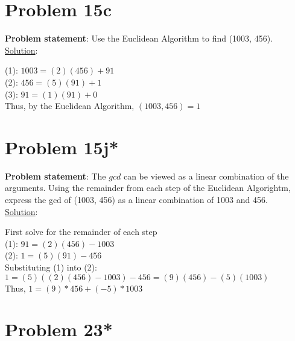 \documentclass{article} %
\begin{document}
\newpage

\section*{Problem 15c}


\textbf{Problem statement}: Use the Euclidean Algorithm to find (1003, 456).
\\

\underline{Solution}: 
\begin{addmargin}[1em]{0em}
(1): $1003 = (2)(456) + 91$
\\(2): $456 = (5)(91) + 1$
\\(3): $91 = (1)(91) + 0$
\\Thus, by the Euclidean Algorithm, $(1003, 456) = 1$
\end{addmargin}

\newpage

\section*{Problem 15j*}


\textbf{Problem statement}: The $gcd$ can be viewed as a linear combination of the arguments.  Using the remainder from each step of the Euclidean Algorightm, express the gcd of (1003, 456) as a linear combination of 1003 and 456.
\\

\underline{Solution}: 
\begin{addmargin}[1em]{0em}
First solve for the remainder of each step
\\(1): $91 = (2)(456) - 1003$
\\(2): $1 = (5)(91) - 456$
\\Substituting (1) into (2):
\\$1 = (5)((2)(456) - 1003) - 456 = (9)(456) - (5)(1003)$
\\Thus, $1 = (9)*456 + (-5)*1003$
\end{addmargin}

\newpage

\section*{Problem 23*}
\end{document}

